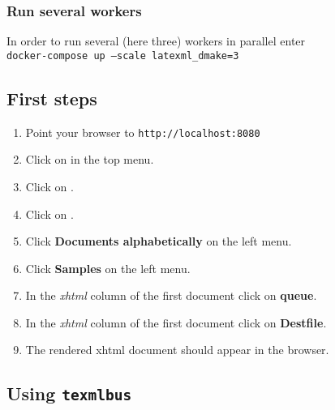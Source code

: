 \documentclass[a4paper]{article}
\newcommand{\texmlbus}{\texttt{texmlbus}}
\begin{document}
\subsubsection{Run several workers}
In order to run several (here three) workers in parallel enter\\
\texttt{docker-compose up --scale latexml\_dmake=3}

\subsection{First steps}
\begin{enumerate}
\item Point your browser to \texttt{http://localhost:8080}
\item Click on  in the top menu.
\item Click on .
\item Click on .
\item Click \textbf{Documents alphabetically} on the left menu. 
\item Click \textbf{Samples} on the left menu. 
\item In the \textit{xhtml} column of the first document click on \textbf{queue}.
\item In the \textit{xhtml} column of the first document click on \textbf{Destfile}.
\item The rendered xhtml document should appear in the browser.
\end{enumerate}

\subsection{Using \texmlbus}
\end{document}
